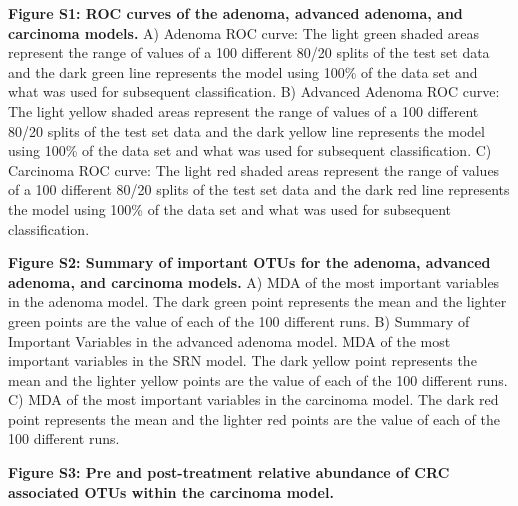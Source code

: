 \documentclass[12pt,]{article}
\begin{document}
\textbf{Figure S1: ROC curves of the adenoma, advanced adenoma, and
carcinoma models.} A) Adenoma ROC curve: The light green shaded areas
represent the range of values of a 100 different 80/20 splits of the
test set data and the dark green line represents the model using 100\%
of the data set and what was used for subsequent classification. B)
Advanced Adenoma ROC curve: The light yellow shaded areas represent the
range of values of a 100 different 80/20 splits of the test set data and
the dark yellow line represents the model using 100\% of the data set
and what was used for subsequent classification. C) Carcinoma ROC curve:
The light red shaded areas represent the range of values of a 100
different 80/20 splits of the test set data and the dark red line
represents the model using 100\% of the data set and what was used for
subsequent classification.

\textbf{Figure S2: Summary of important OTUs for the adenoma, advanced
adenoma, and carcinoma models.} A) MDA of the most important variables
in the adenoma model. The dark green point represents the mean and the
lighter green points are the value of each of the 100 different runs. B)
Summary of Important Variables in the advanced adenoma model. MDA of the
most important variables in the SRN model. The dark yellow point
represents the mean and the lighter yellow points are the value of each
of the 100 different runs. C) MDA of the most important variables in the
carcinoma model. The dark red point represents the mean and the lighter
red points are the value of each of the 100 different runs.

\textbf{Figure S3: Pre and post-treatment relative abundance of CRC
associated OTUs within the carcinoma model.}

\newpage
\end{document}

